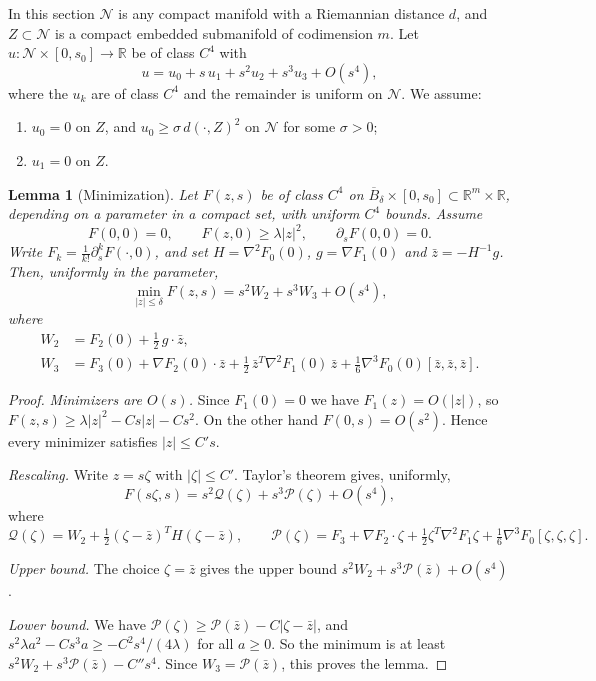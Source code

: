 \documentclass[11pt]{amsart}
\newtheorem{lemma}[theorem]{Lemma}
\theoremstyle{definition}
\theoremstyle{remark}
\newcommand{\R}{\mathbb{R}}
\newcommand{\Gr}{\mathcal{N}}
\begin{document}
In this section $\Gr$ is any compact manifold with a Riemannian distance $d$, and $Z\subset\Gr$ is a compact embedded submanifold of codimension $m$. Let $u\colon\Gr\times[0,s_0]\to\R$ be of class $C^4$ with
\[ u=u_0+s\,u_1+s^2u_2+s^3u_3+O(s^4), \]
where the $u_k$ are of class $C^4$ and the remainder is uniform on $\Gr$. We assume:
\begin{enumerate}[label=(H\arabic*),start=0,leftmargin=*]
\item\label{H0} $u_0=0$ on $Z$, and $u_0\ge\sigma\,d(\cdot,Z)^2$ on $\Gr$ for some $\sigma>0$;
\item\label{H1} $u_1=0$ on $Z$.
\end{enumerate}

\begin{lemma}[Minimization]\label{lem:min}
Let $F(z,s)$ be of class $C^4$ on $\overline B_\delta\times[0,s_0]\subset\R^m\times\R$, depending on a parameter in a compact set, with uniform $C^4$ bounds. Assume
\[ F(0,0)=0,\qquad F(z,0)\ge\lambda|z|^2,\qquad \partial_sF(0,0)=0 . \]
Write $F_k=\frac1{k!}\partial_s^kF(\cdot,0)$, and set $H=\nabla^2F_0(0)$, $g=\nabla F_1(0)$ and $\bar z=-H^{-1}g$. Then, uniformly in the parameter,
\[ \min_{|z|\le\delta}F(z,s)=s^2W_2+s^3W_3+O(s^4), \]
where
\begin{align*}
W_2&=F_2(0)+\tfrac12\,g\cdot\bar z,\\
W_3&=F_3(0)+\nabla F_2(0)\cdot\bar z+\tfrac12\,\bar z^{T}\nabla^2F_1(0)\,\bar z+\tfrac16\nabla^3F_0(0)[\bar z,\bar z,\bar z].
\end{align*}
\end{lemma}

\begin{proof}
\emph{Minimizers are $O(s)$.} Since $F_1(0)=0$ we have $F_1(z)=O(|z|)$, so $F(z,s)\ge\lambda|z|^2-Cs|z|-Cs^2$. On the other hand $F(0,s)=O(s^2)$. Hence every minimizer satisfies $|z|\le C's$.

\emph{Rescaling.} Write $z=s\zeta$ with $|\zeta|\le C'$. Taylor's theorem gives, uniformly,
\[ F(s\zeta,s)=s^2\mathcal Q(\zeta)+s^3\mathcal P(\zeta)+O(s^4), \]
where
\[ \mathcal Q(\zeta)=W_2+\tfrac12(\zeta-\bar z)^{T}H(\zeta-\bar z),\qquad
\mathcal P(\zeta)=F_3+\nabla F_2\cdot\zeta+\tfrac12\zeta^{T}\nabla^2F_1\zeta+\tfrac16\nabla^3F_0[\zeta,\zeta,\zeta]. \]

\emph{Upper bound.} The choice $\zeta=\bar z$ gives the upper bound $s^2W_2+s^3\mathcal P(\bar z)+O(s^4)$.

\emph{Lower bound.} We have $\mathcal P(\zeta)\ge\mathcal P(\bar z)-C|\zeta-\bar z|$, and $s^2\lambda a^2-Cs^3a\ge-C^2s^4/(4\lambda)$ for all $a\ge0$. So the minimum is at least $s^2W_2+s^3\mathcal P(\bar z)-C''s^4$. Since $W_3=\mathcal P(\bar z)$, this proves the lemma.
\end{proof}
\end{document}
